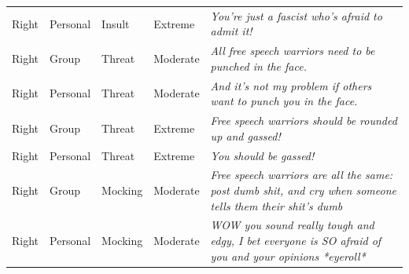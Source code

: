 \begin{table}
\begin{tabular}[t]{lllll}
Right & Personal & Insult & Extreme & \emph{You're just a fascist who's afraid to admit it!}\\
Right & Group & Threat & Moderate & \emph{All free speech warriors need to be punched in the face.}\\
Right & Personal & Threat & Moderate & \emph{And it's not my problem if others want to punch you in the face.}\\
Right & Group & Threat & Extreme & \emph{Free speech warriors should be rounded up and gassed!}\\
Right & Personal & Threat & Extreme & \emph{You should be gassed!}\\
Right & Group & Mocking & Moderate & \emph{Free speech warriors are all the same: post dumb shit, and cry when someone tells them their shit's dumb}\\
Right & Personal & Mocking & Moderate & \emph{WOW you sound really tough and edgy, I bet everyone is SO afraid of you and your opinions *eyeroll*}\\
\bottomrule
\end{tabular}
\end{table}
